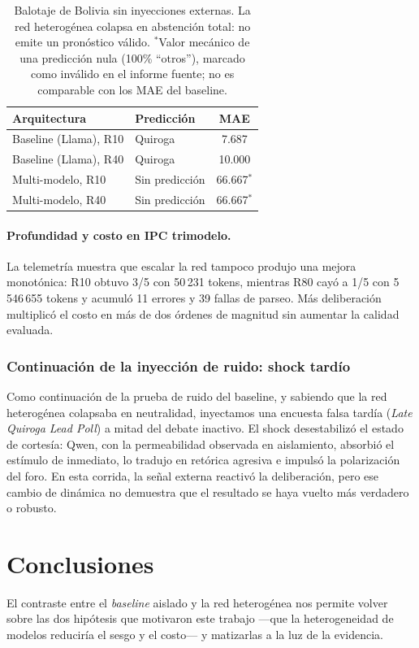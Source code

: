 \documentclass[11pt]{article}
\begin{document}
\begin{table}[t]
\centering
\small
\begin{tabular}{@{}llc@{}}
\toprule
\textbf{Arquitectura} & \textbf{Predicción} & \textbf{MAE} \\
\midrule
Baseline (Llama), R10 & Quiroga & 7.687 \\
Baseline (Llama), R40 & Quiroga & 10.000 \\
Multi-modelo, R10 & Sin predicción & 66.667$^{*}$ \\
Multi-modelo, R40 & Sin predicción & 66.667$^{*}$ \\
\bottomrule
\end{tabular}
\caption{Balotaje de Bolivia sin inyecciones externas. La red heterogénea colapsa en abstención total: no emite un pronóstico válido. $^{*}$Valor mecánico de una predicción nula (100\% ``otros''), marcado como inválido en el informe fuente; no es comparable con los MAE del baseline.}
\label{tab:collapse}
\end{table}

\paragraph{Profundidad y costo en IPC trimodelo.} La telemetría muestra que escalar la red tampoco produjo una mejora monotónica: R10 obtuvo 3/5 con 50\,231 tokens, mientras R80 cayó a 1/5 con 5\,546\,655 tokens y acumuló 11 errores y 39 fallas de parseo. Más deliberación multiplicó el costo en más de dos órdenes de magnitud sin aumentar la calidad evaluada.

\subsubsection{Continuación de la inyección de ruido: shock tardío}

Como continuación de la prueba de ruido del baseline, y sabiendo que la red heterogénea colapsaba en neutralidad, inyectamos una encuesta falsa tardía (\textit{Late Quiroga Lead Poll}) a mitad del debate inactivo. El shock desestabilizó el estado de cortesía: Qwen, con la permeabilidad observada en aislamiento, absorbió el estímulo de inmediato, lo tradujo en retórica agresiva e impulsó la polarización del foro. En esta corrida, la señal externa reactivó la deliberación, pero ese cambio de dinámica no demuestra que el resultado se haya vuelto más verdadero o robusto.

\section{Conclusiones}
\label{sec:conclusiones}
El contraste entre el \textit{baseline} aislado y la red heterogénea nos permite volver sobre las dos hipótesis que motivaron este trabajo —que la heterogeneidad de modelos reduciría el sesgo y el costo— y matizarlas a la luz de la evidencia.
\end{document}
